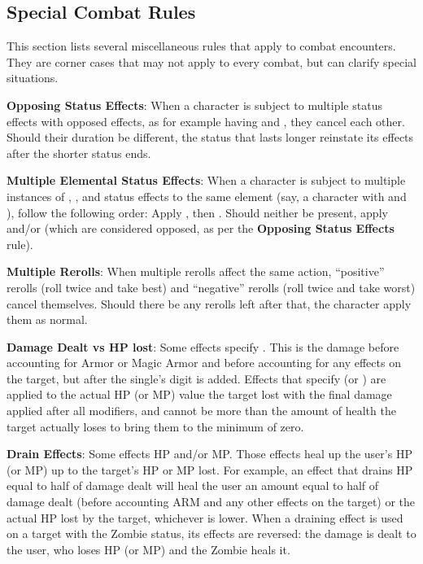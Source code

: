 \begin{multicols}{2}
\subsection{Special Combat Rules}\label{misccombat}
This section lists several miscellaneous rules that apply to combat encounters. They are corner cases that may not apply to every combat, but can clarify special situations.

\textbf{Opposing Status Effects}: When a character is subject to multiple status effects with opposed effects, as for example having  and , they cancel each other. Should their duration be different, the status that lasts longer reinstate its effects after the shorter status ends.

\textbf{Multiple Elemental Status Effects}: When a character is subject to multiple instances of , ,  and  status effects to the same element (say, a character with  and ), follow the following order: Apply , then . Should neither be present, apply  and/or  (which are considered opposed, as per the \textbf{Opposing Status Effects} rule).  

\textbf{Multiple Rerolls}: When multiple rerolls affect the same action, \enquote{positive} rerolls (roll twice and take best) and \enquote{negative} rerolls (roll twice and take worst) cancel themselves. Should there be any rerolls left after that, the character apply them as normal. 

\textbf{Damage Dealt vs HP lost}: Some effects specify . This is the damage before accounting for Armor or Magic Armor and before accounting for any effects on the target, but after the single's digit is added. Effects that specify  (or ) are applied to the actual HP (or MP) value the target lost with the final damage applied after all modifiers, and cannot be more than the amount of health the target actually loses to bring them to the minimum of zero.

\textbf{Drain Effects}: Some effects  HP and/or MP\@. Those effects heal up the user's HP (or MP) up to the target's HP or MP lost. For example, an effect that drains HP equal to half of damage dealt will heal the user an amount equal to half of damage dealt (before accounting ARM and any other effects on the target) or the actual HP lost by the target, whichever is lower. When a draining effect is used on a target with the Zombie status, its effects are reversed: the damage is dealt to the user, who loses HP (or MP) and the Zombie heals it.


\end{multicols}
